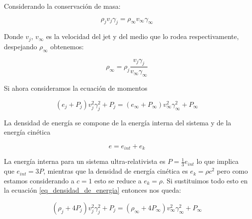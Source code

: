 \documentclass[12pt,a4paper]{book}
\begin{document}





Considerando la conservación de masa:

\begin{equation}
  \rho_j v_j \gamma_j=  \rho_{\infty} v_{\infty} \gamma_{\infty}
\end{equation}

Donde $v_j$, $v_\infty$ es la velocidad del jet y del medio que lo rodea respectivamente, despejando $\rho_{\infty}$ obtenemos:

\begin{equation}\label{eq_masa_densidad_despejada}
  \rho_\infty = \rho_j \frac{v_j \gamma_j }{v_\infty \gamma_\infty}
\end{equation}

Si ahora consideramos la ecuación de momentos

\begin{equation}
  \left( e_j + P_j\right) v^2_j \gamma^2_j + P_j = \left( e_{\infty} + P_{\infty}\right) v^2_{\infty} \gamma^2_{\infty} + P_{\infty}
\end{equation}

La densidad de energía se compone de la energía interna del sistema y de la energía cinética

\begin{equation} \label{eq_densidad_de_energia}
  e = e_{int} + e_k
\end{equation}

La energía interna para un sistema ultra-relativista es $ P = \frac{1}{3}e_{int}$ lo que implica que $e_{int} = 3P$, mientras que la densidad de energía
cinética es $e_k = \rho c^2$ pero como estamos considerando a $c = 1$ esto se reduce a $e_k = \rho$. Si sustituimos todo esto en la ecuación
\ref{eq_densidad_de_energia} entonces nos queda:

\begin{equation} \label{eq_momentos_relativista_modificada}
  \left( \rho_j + 4P_j \right) v^2_j \gamma^2_j  +P_j = \left( \rho_\infty + 4P_\infty \right) v^2_{\infty} \gamma^2_{\infty}  +P_\infty
\end{equation}
\end{document}
